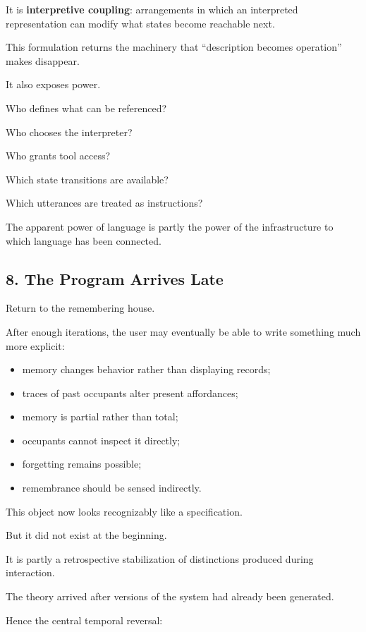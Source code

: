 \documentclass[
]{article}
\providecommand{\tightlist}{%
  \setlength{\itemsep}{0pt}\setlength{\parskip}{0pt}}
\begin{document}
It is \textbf{interpretive coupling}: arrangements in which an
interpreted representation can modify what states become reachable next.

This formulation returns the machinery that ``description becomes
operation'' makes disappear.

It also exposes power.

Who defines what can be referenced?

Who chooses the interpreter?

Who grants tool access?

Which state transitions are available?

Which utterances are treated as instructions?

The apparent power of language is partly the power of the infrastructure
to which language has been connected.

\subsection{8. The Program Arrives
Late}\label{the-program-arrives-late-1}

Return to the remembering house.

After enough iterations, the user may eventually be able to write
something much more explicit:

\begin{itemize}
\tightlist
\item
  memory changes behavior rather than displaying records;
\item
  traces of past occupants alter present affordances;
\item
  memory is partial rather than total;
\item
  occupants cannot inspect it directly;
\item
  forgetting remains possible;
\item
  remembrance should be sensed indirectly.
\end{itemize}

This object now looks recognizably like a specification.

But it did not exist at the beginning.

It is partly a retrospective stabilization of distinctions produced
during interaction.

The theory arrived after versions of the system had already been
generated.

Hence the central temporal reversal:
\end{document}
